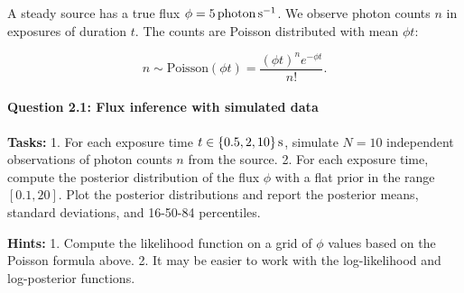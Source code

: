 \documentclass[11pt]{article}
\begin{document}
A steady source has a true flux
\(\phi = 5\,{\rm photon}\,{\rm s}^{-1}\). We observe photon counts \(n\)
in exposures of duration \(t\). The counts are Poisson distributed with
mean \(\phi t\):

\[
n \sim \text{Poisson}(\phi t) = \frac{(\phi t)^{n} e^{-\phi t}}{n!}.
\]

\paragraph{Question 2.1: Flux inference with simulated
data}\label{question-2.1-flux-inference-with-simulated-data}

\textbf{Tasks:} 1. For each exposure time
\(t \in \{0.5, 2, 10\}\,{\rm s}\), simulate \(N=10\) independent
observations of photon counts \(n\) from the source. 2. For each
exposure time, compute the posterior distribution of the flux \(\phi\)
with a flat prior in the range \([0.1, 20]\). Plot the posterior
distributions and report the posterior means, standard deviations, and
16-50-84 percentiles.

\textbf{Hints:} 1. Compute the likelihood function on a grid of \(\phi\)
values based on the Poisson formula above. 2. It may be easier to work
with the log-likelihood and log-posterior functions.
\end{document}
